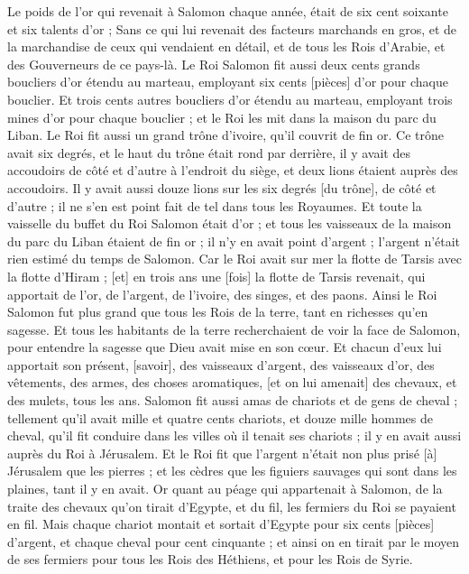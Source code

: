 \begin{multicols}{2}
Le poids de l'or qui revenait à Salomon chaque année, était de six cent soixante et six talents d'or ;
Sans ce qui lui revenait des facteurs marchands en gros, et de la marchandise de ceux qui vendaient en détail, et de tous les Rois d'Arabie, et des Gouverneurs de ce pays-là.
Le Roi Salomon fit aussi deux cents grands boucliers d'or étendu au marteau, employant six cents [pièces] d'or pour chaque bouclier.
Et trois cents autres boucliers d'or étendu au marteau, employant trois mines d'or pour chaque bouclier ; et le Roi les mit dans la maison du parc du Liban.
Le Roi fit aussi un grand trône d'ivoire, qu'il couvrit de fin or.
Ce trône avait six degrés, et le haut du trône était rond par derrière, il y avait des accoudoirs de côté et d'autre à l'endroit du siège, et deux lions étaient auprès des accoudoirs.
Il y avait aussi douze lions sur les six degrés [du trône], de côté et d'autre ; il ne s'en est point fait de tel dans tous les Royaumes.
Et toute la vaisselle du buffet du Roi Salomon était d'or ; et tous les vaisseaux de la maison du parc du Liban étaient de fin or ; il n'y en avait point d'argent ; l'argent n'était rien estimé du temps de Salomon.
Car le Roi avait sur mer la flotte de Tarsis avec la flotte d'Hiram ; [et] en trois ans une [fois] la flotte de Tarsis revenait, qui apportait de l'or, de l'argent, de l'ivoire, des singes, et des paons.
Ainsi le Roi Salomon fut plus grand que tous les Rois de la terre, tant en richesses qu'en sagesse.
Et tous les habitants de la terre recherchaient de voir la face de Salomon, pour entendre la sagesse que Dieu avait mise en son cœur.
Et chacun d'eux lui apportait son présent, [savoir], des vaisseaux d'argent, des vaisseaux d'or, des vêtements, des armes, des choses aromatiques, [et on lui amenait] des chevaux, et des mulets, tous les ans.
Salomon fit aussi amas de chariots et de gens de cheval ; tellement qu'il avait mille et quatre cents chariots, et douze mille hommes de cheval, qu'il fit conduire dans les villes où il tenait ses chariots ; il y en avait aussi auprès du Roi à Jérusalem.
Et le Roi fit que l'argent n'était non plus prisé [à] Jérusalem que les pierres ; et les cèdres que les figuiers sauvages qui sont dans les plaines, tant il y en avait.
Or quant au péage qui appartenait à Salomon, de la traite des chevaux qu'on tirait d'Egypte, et du fil, les fermiers du Roi se payaient en fil.
Mais chaque chariot montait et sortait d'Egypte pour six cents [pièces] d'argent, et chaque cheval pour cent cinquante ; et ainsi on en tirait par le moyen de ses fermiers pour tous les Rois des Héthiens, et pour les Rois de Syrie.

\end{multicols}
